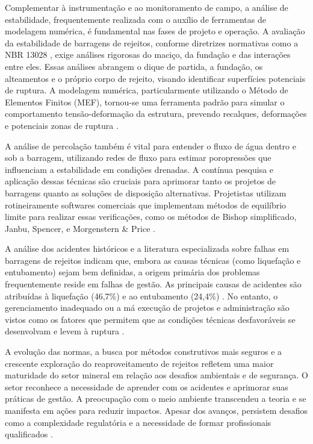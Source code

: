 Complementar à instrumentação e ao monitoramento de campo, a análise de estabilidade, frequentemente realizada com o auxílio de ferramentas de modelagem numérica, é fundamental nas fases de projeto e operação. A avaliação da estabilidade de barragens de rejeitos, conforme diretrizes normativas como a NBR 13028 \cite{abnt2017}, exige análises rigorosas do maciço, da fundação e das interações entre eles. Essas análises abrangem o dique de partida, a fundação, os alteamentos e o próprio corpo de rejeito, visando identificar superfícies potenciais de ruptura. A modelagem numérica, particularmente utilizando o Método de Elementos Finitos (MEF), tornou-se uma ferramenta padrão para simular o comportamento tensão-deformação da estrutura, prevendo recalques, deformações e potenciais zonas de ruptura \cite{desouzajunior2018}. 

A análise de percolação também é vital para entender o fluxo de água dentro e sob a barragem, utilizando redes de fluxo para estimar poropressões que influenciam a estabilidade em condições drenadas. A contínua pesquisa e aplicação dessas técnicas são cruciais para aprimorar tanto os projetos de barragens quanto as soluções de disposição alternativas. Projetistas utilizam rotineiramente softwares comerciais que implementam métodos de equilíbrio limite para realizar essas verificações, como os métodos de Bishop simplificado, Janbu, Spencer, e Morgenstern \& Price \cite{araujo2006, desouzajunior2018}.

A análise dos acidentes históricos e a literatura especializada sobre falhas em barragens de rejeitos indicam que, embora as causas técnicas (como liquefação e entubamento) sejam bem definidas, a origem primária dos problemas frequentemente reside em falhas de gestão. As principais causas de acidentes são atribuídas à liquefação (46,7\%) e ao entubamento (24,4\%) \cite{soares2010}. No entanto, o gerenciamento inadequado ou a má execução de projetos e administração são vistos como os fatores que permitem que as condições técnicas desfavoráveis se desenvolvam e levem à ruptura \cite{duarte2008, carneiro2018}.

A evolução das normas, a busca por métodos construtivos mais seguros e a crescente exploração do reaproveitamento de rejeitos refletem uma maior maturidade do setor mineral em relação aos desafios ambientais e de segurança. O setor reconhece a necessidade de aprender com os acidentes e aprimorar suas práticas de gestão. A preocupação com o meio ambiente transcendeu a teoria e se manifesta em ações para reduzir impactos. Apesar dos avanços, persistem desafios como a complexidade regulatória e a necessidade de formar profissionais qualificados \cite{pmb2023}.

